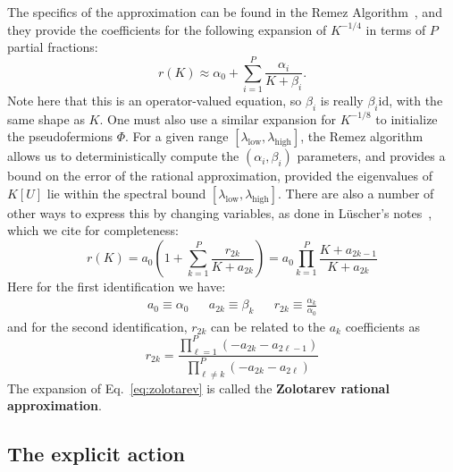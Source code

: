 The specifics of the approximation can be found in the Remez Algorithm~\cite{Clark:2006fx}, and they provide the coefficients for the following expansion of $K^{-1/4}$ in terms of $P$ partial fractions:
\begin{equation}
	r(K) \approx \alpha_0 + \sum_{i = 1}^P \frac{\alpha_i}{K + \beta_i}.
	\label{eq:rational_approx}
\end{equation}
Note here that this is an operator-valued equation, so $\beta_i$ is really $\beta_i \mathrm{id}$, with the same shape as $K$. One must also use a similar expansion for $K^{-1/8}$ to initialize the pseudofermions $\Phi$. For a given range $[\lambda_\mathrm{low}, \lambda_\mathrm{high}]$, the Remez algorithm allows us to deterministically compute the $(\alpha_i, \beta_i)$ parameters, and provides a bound on the error of the rational approximation, provided the eigenvalues of $K[U]$ lie within the spectral bound $[\lambda_\mathrm{low}, \lambda_\mathrm{high}]$. There are also a number of other ways to express this by changing variables, as done in L\"uscher's notes~\cite{Luscher:2010ae}, which we cite for completeness:
\begin{equation}
	r(K) = a_0 \left( 1 + \sum_{k = 1}^P \frac{r_{2k}}{K + a_{2k}} \right) = a_0\prod_{k = 1}^P \frac{K + a_{2k - 1}}{K + a_{2k}}
	\label{eq:zolotarev}
\end{equation}
Here for the first identification we have:
\begin{align}
	a_0\equiv \alpha_0 && a_{2k} \equiv \beta_k && r_{2k}\equiv \frac{\alpha_k}{\alpha_0}
\end{align}
and for the second identification, $r_{2k}$ can be related to the $a_k$ coefficients as
\begin{equation}
	r_{2k} = \frac{\prod_{\ell = 1}^P (-a_{2k} - a_{2\ell - 1})}{\prod_{\ell\neq k}^P (-a_{2k} - a_{2\ell})}
\end{equation}
The expansion of Eq.~\eqref{eq:zolotarev} is called the \textbf{Zolotarev rational approximation}. 

\subsection{The explicit action}

